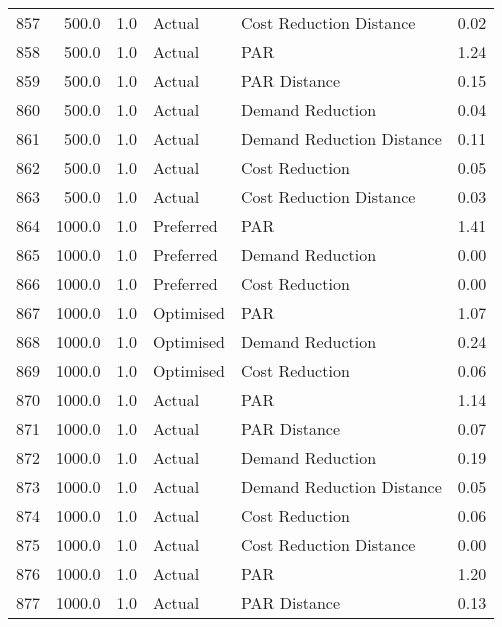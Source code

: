 \begin{longtable}{lrrllr}
857  &        500.0 &     1.0 &         Actual &    Cost Reduction Distance &   0.02 \\
858  &        500.0 &     1.0 &         Actual &                        PAR &   1.24 \\
859  &        500.0 &     1.0 &         Actual &               PAR Distance &   0.15 \\
860  &        500.0 &     1.0 &         Actual &           Demand Reduction &   0.04 \\
861  &        500.0 &     1.0 &         Actual &  Demand Reduction Distance &   0.11 \\
862  &        500.0 &     1.0 &         Actual &             Cost Reduction &   0.05 \\
863  &        500.0 &     1.0 &         Actual &    Cost Reduction Distance &   0.03 \\
864  &       1000.0 &     1.0 &      Preferred &                        PAR &   1.41 \\
865  &       1000.0 &     1.0 &      Preferred &           Demand Reduction &   0.00 \\
866  &       1000.0 &     1.0 &      Preferred &             Cost Reduction &   0.00 \\
867  &       1000.0 &     1.0 &      Optimised &                        PAR &   1.07 \\
868  &       1000.0 &     1.0 &      Optimised &           Demand Reduction &   0.24 \\
869  &       1000.0 &     1.0 &      Optimised &             Cost Reduction &   0.06 \\
870  &       1000.0 &     1.0 &         Actual &                        PAR &   1.14 \\
871  &       1000.0 &     1.0 &         Actual &               PAR Distance &   0.07 \\
872  &       1000.0 &     1.0 &         Actual &           Demand Reduction &   0.19 \\
873  &       1000.0 &     1.0 &         Actual &  Demand Reduction Distance &   0.05 \\
874  &       1000.0 &     1.0 &         Actual &             Cost Reduction &   0.06 \\
875  &       1000.0 &     1.0 &         Actual &    Cost Reduction Distance &   0.00 \\
876  &       1000.0 &     1.0 &         Actual &                        PAR &   1.20 \\
877  &       1000.0 &     1.0 &         Actual &               PAR Distance &   0.13 \\

\end{longtable}
